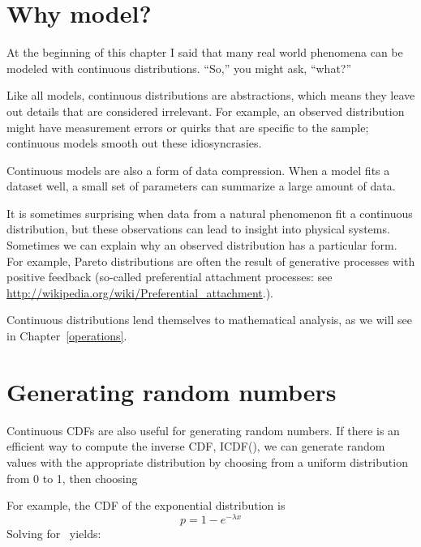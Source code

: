 \documentclass[12pt]{book}
\begin{document}
\section{Why model?}

At the beginning of this chapter I said that many real world phenomena
can be modeled with continuous distributions.  ``So,'' you might ask,
``what?''

Like all models, continuous distributions are abstractions, which
means they leave out details that are considered irrelevant.
For example, an observed distribution might have measurement errors
or quirks that are specific to the sample; continuous models smooth
out these idiosyncrasies.

Continuous models are also a form of data compression.  When a model
fits a dataset well, a small set of parameters can summarize a
large amount of data.

It is sometimes surprising when data from a natural phenomenon fit a
continuous distribution, but these observations can lead to insight
into physical systems.  Sometimes we can explain why an observed
distribution has a particular form.  For example, Pareto distributions
are often the result of generative processes with positive feedback
(so-called preferential attachment processes: see
\url{http://wikipedia.org/wiki/Preferential_attachment}.).

Continuous distributions lend themselves to mathematical analysis, as
we will see in Chapter~\ref{operations}.


\section{Generating random numbers}

Continuous CDFs are also useful for generating random numbers.
If there is an efficient way to compute the inverse CDF, ICDF(\p),
we can generate random values with the appropriate distribution
by choosing from a uniform distribution from 0 to 1, then choosing


For example, the CDF of the exponential distribution is
%
\[ p = 1 - e^{-\lambda x} \]
%
Solving for \x~yields:
\end{document}
